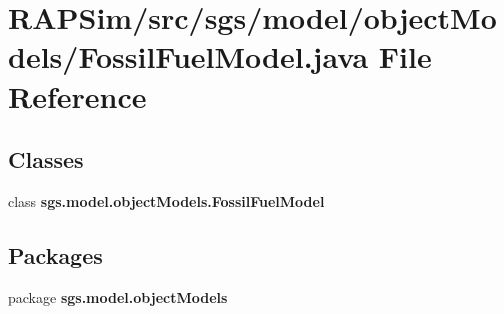 \section{R\-A\-P\-Sim/src/sgs/model/object\-Models/\-Fossil\-Fuel\-Model.java File Reference}
\label{_fossil_fuel_model_8java}
\subsection*{Classes}
\begin{DoxyCompactItemize}
\item 
class {\bf sgs.\-model.\-object\-Models.\-Fossil\-Fuel\-Model}
\end{DoxyCompactItemize}
\subsection*{Packages}
\begin{DoxyCompactItemize}
\item 
package {\bf sgs.\-model.\-object\-Models}
\end{DoxyCompactItemize}
